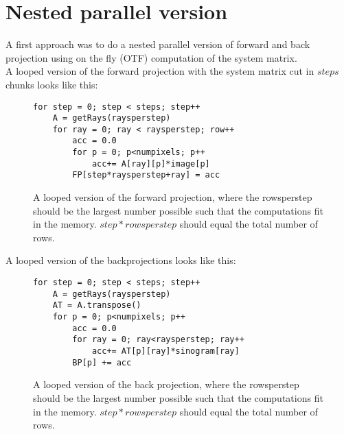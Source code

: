\section{Nested parallel version}
A first approach was to do a nested parallel version of forward and back projection using on the fly (OTF) computation of the system matrix.\\
A looped version of the forward projection with the system matrix cut in $steps$ chunks looks like this:
\begin{figure}[h]
\begin{lstlisting}[frame=single]
for step = 0; step < steps; step++
	A = getRays(raysperstep)
	for ray = 0; ray < raysperstep; row++
		acc = 0.0
		for p = 0; p<numpixels; p++
			acc+= A[ray][p]*image[p]
		FP[step*raysperstep+ray] = acc
\end{lstlisting}
  \caption{A looped version of the forward projection, where the rowsperstep should be the largest number possible such that the computations fit in the memory. $step*rowsperstep$ should equal the total number of rows.}
\end{figure}

A looped version of the backprojections looks like this:
\begin{figure}[h]
\begin{lstlisting}[frame=single]
for step = 0; step < steps; step++
	A = getRays(raysperstep)
	AT = A.transpose()
	for p = 0; p<numpixels; p++
		acc = 0.0
		for ray = 0; ray<raysperstep; ray++
			acc+= AT[p][ray]*sinogram[ray]
		BP[p] += acc
\end{lstlisting}
  \caption{A looped version of the back projection, where the rowsperstep should be the largest number possible such that the computations fit in the memory. $step*rowsperstep$ should equal the total number of rows.}
\end{figure}

